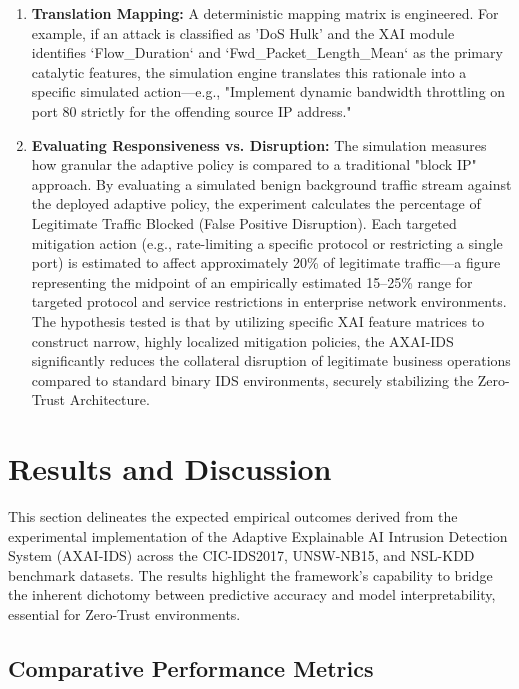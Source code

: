 \documentclass[conference]{IEEEtran}
\begin{document}
\begin{enumerate}
\item \textbf{Translation Mapping:} A deterministic mapping matrix is engineered. For example, if an attack is classified as 'DoS Hulk' and the XAI module identifies `Flow\_Duration` and `Fwd\_Packet\_Length\_Mean` as the primary catalytic features, the simulation engine translates this rationale into a specific simulated action—e.g., "Implement dynamic bandwidth throttling on port 80 strictly for the offending source IP address."
\item \textbf{Evaluating Responsiveness vs. Disruption:} The simulation measures how granular the adaptive policy is compared to a traditional "block IP" approach. By evaluating a simulated benign background traffic stream against the deployed adaptive policy, the experiment calculates the percentage of Legitimate Traffic Blocked (False Positive Disruption). Each targeted mitigation action (e.g., rate-limiting a specific protocol or restricting a single port) is estimated to affect approximately 20\% of legitimate traffic—a figure representing the midpoint of an empirically estimated 15–25\% range for targeted protocol and service restrictions in enterprise network environments. The hypothesis tested is that by utilizing specific XAI feature matrices to construct narrow, highly localized mitigation policies, the AXAI-IDS significantly reduces the collateral disruption of legitimate business operations compared to standard binary IDS environments, securely stabilizing the Zero-Trust Architecture.
\end{enumerate}


\section{Results and Discussion}

This section delineates the expected empirical outcomes derived from the experimental implementation of the Adaptive Explainable AI Intrusion Detection System (AXAI-IDS) across the CIC-IDS2017, UNSW-NB15, and NSL-KDD benchmark datasets. The results highlight the framework's capability to bridge the inherent dichotomy between predictive accuracy and model interpretability, essential for Zero-Trust environments.

\subsection{Comparative Performance Metrics}
\end{document}
